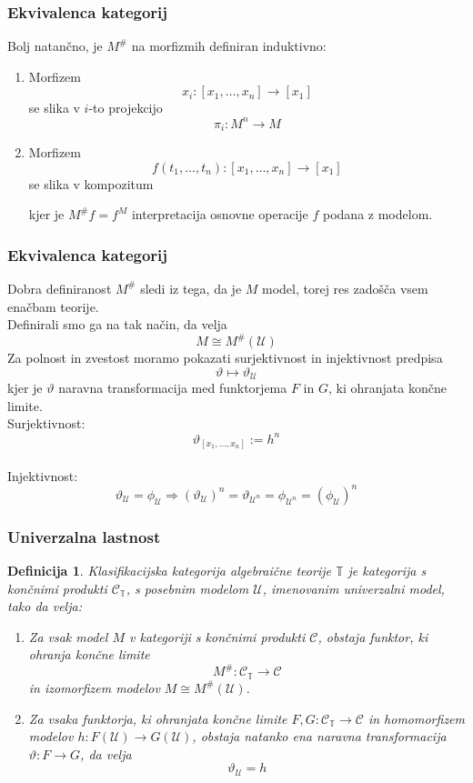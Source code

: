 \documentclass{beamer}
\newtheorem{definicija}{Definicija}
\begin{document}
\begin{frame}[fragile]
\frametitle{Ekvivalenca kategorij}
Bolj natančno, je $M^{\#}$ na morfizmih definiran induktivno:
\begin{enumerate}
\item Morfizem $$x_i : [x_1, \ldots, x_n] \to [x_1]$$ se slika v $i$-to projekcijo $$\pi_i : M^n \to M$$
\item Morfizem $$f(t_1, \ldots, t_n) : [x_1, \ldots, x_n] \to [x_1]$$ se slika v kompozitum
\begin{center}
\end{center}
kjer je $M^{\#}f = f^M$ interpretacija osnovne operacije $f$ podana z modelom.
\end{enumerate}
\end{frame}

\begin{frame}
\frametitle{Ekvivalenca kategorij}
Dobra definiranost $M^{\#}$ sledi iz tega, da je $M$ model, torej res zadošča vsem enačbam teorije.\\
\pause
Definirali smo ga na tak način, da velja
$$M \cong M^{\#}(\mathcal{U})$$
\pause
Za polnost in zvestost moramo pokazati surjektivnost in injektivnost predpisa $$\vartheta \mapsto \vartheta_\mathcal{U}$$
kjer je $\vartheta$ naravna transformacija med funktorjema $F$ in $G$, ki ohranjata končne limite.\\
Surjektivnost: $$\vartheta_{[x_1, \ldots, x_n]} := h^n$$\\
Injektivnost: $$\vartheta_\mathcal{U} = \phi_\mathcal{U} \Rightarrow (\vartheta_\mathcal{U})^n = \vartheta_{\mathcal{U}^n} = \phi_{\mathcal{U}^n} = (\phi_\mathcal{U})^n$$
\end{frame}

\begin{frame}
\frametitle{Univerzalna lastnost}
\begin{definicija}
\emph{Klasifikacijska kategorija} algebraične teorije $\mathbb{T}$ je kategorija s končnimi produkti $\mathcal{C}_\mathbb{T}$, s posebnim modelom $\mathcal{U}$, imenovanim \emph{univerzalni model}, tako da velja:
\begin{enumerate}
\pause
\item Za vsak model $M$ v kategoriji s končnimi produkti $\mathcal{C}$, obstaja funktor, ki ohranja končne limite $$M^{\#} : \mathcal{C}_\mathbb{T} \to \mathcal{C}$$
in izomorfizem modelov $M \cong M^{\#}(\mathcal{U})$.
\pause
\item Za vsaka funktorja, ki ohranjata končne limite $F,G : \mathcal{C}_\mathbb{T} \to \mathcal{C}$ in homomorfizem modelov $h: F(\mathcal{U}) \to G(\mathcal{U})$, obstaja natanko ena naravna transformacija $\vartheta : F \to G$, da velja
$$\vartheta_\mathcal{U} = h$$
\end{enumerate}
\end{definicija}
\end{frame}
\end{document}
